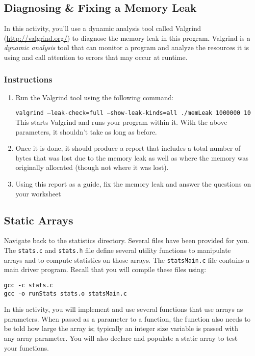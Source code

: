 \documentclass[12pt]{scrartcl}
\begin{document}
\subsection{Diagnosing \& Fixing a Memory Leak}

In this activity, you'll use a dynamic analysis tool called 
Valgrind (\url{http://valgrind.org/}) to diagnose the memory leak
in this program.  Valgrind is a \emph{dynamic analysis} tool that
can monitor a program and analyze the resources it is using and
call attention to errors that may occur at runtime.  

\subsubsection*{Instructions}
\begin{enumerate}
  \item Run the Valgrind tool using the following command:
  
\texttt{valgrind --leak-check=full --show-leak-kinds=all ./memLeak 1000000 10}
   This starts Valgrind and runs your program within it.  With the above 
   parameters, it shouldn't take as long as before.
  \item Once it is done, it should produce a report that includes a total number of
  bytes that was lost due to the memory leak as well as where the memory
  was originally allocated (though not where it was lost).  
  \item Using this report as a guide, fix the memory leak and answer 
  the questions on your worksheet
\end{enumerate}
  
\subsection{Static Arrays}

Navigate back to the statistics directory.  Several files have been 
provided for you.  The \texttt{stats.c} and \texttt{stats.h} 
file define several utility functions to manipulate arrays and to 
compute statistics on those arrays.  The \texttt{statsMain.c} 
file contains a main driver program.  Recall that you will compile 
these files using:

\begin{verbatim}
gcc -c stats.c
gcc -o runStats stats.o statsMain.c
\end{verbatim}

In this activity, you will implement and use several functions that use 
arrays as parameters.  When passed as a parameter to a function, 
the function also needs to be told how large the array is; typically an 
integer size variable is passed with any array parameter.  You will also 
declare and populate a static array to test your functions.
\end{document}
